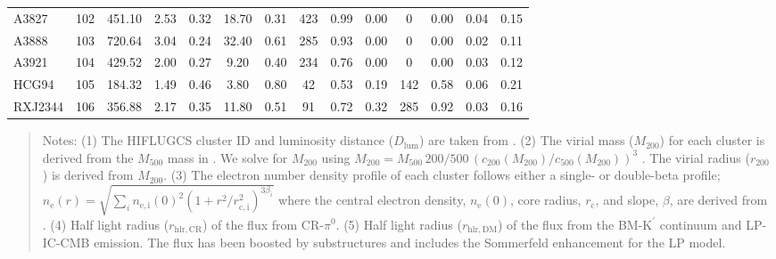\documentclass[10pt,aps,pra,reprint,amsmath,amsfonts,amssymb,showpacs,nofootinbib,floatfix]{revtex4-1}
\newcommand{\rmn}{\mathrm}
\newcommand{\Kp}{\rmn{K}^\prime}
\newcommand{\vst}{\vspace{-0.14mm}}
\newcommand{\rvir}{r_{200}}
\newcommand{\mvir}{M_{200}}
\begin{document}
\begin{table}
\begin{minipage}{2.0\columnwidth}
\begin{tabular}{l c c c c c c c c c c c c c}
A3827 & 102 & 451.10 & 2.53 & 0.32 & 18.70 & 0.31 & 423 & 0.99 & 0.00 & 0 & 0.00 & 0.04 & 0.15 \vst \\
A3888 & 103 & 720.64 & 3.04 & 0.24 & 32.40 & 0.61 & 285 & 0.93 & 0.00 & 0 & 0.00 & 0.02 & 0.11 \vst \\
A3921 & 104 & 429.52 & 2.00 & 0.27 & 9.20 & 0.40 & 234 & 0.76 & 0.00 & 0 & 0.00 & 0.03 & 0.12 \vst \\
HCG94 & 105 & 184.32 & 1.49 & 0.46 & 3.80 & 0.80 & 42 & 0.53 & 0.19 & 142 & 0.58 & 0.06 & 0.21 \vst \\
RXJ2344 & 106 & 356.88 & 2.17 & 0.35 & 11.80 & 0.51 & 91 & 0.72 & 0.32 & 285 & 0.92 & 0.03 & 0.16 \vst \\
\hline
\hline
\end{tabular}
\begin{quote}
  Notes:
  (1) The HIFLUGCS cluster ID and luminosity distance
  ($D_\rmn{lum}$) are taken from \cite{2002ApJ...567..716R}.
  (2) The virial mass ($\mvir$) for each cluster is derived from the $M_{500}$
  mass in \cite{2007A&A...466..805C}. We solve for $\mvir$ using
  $\mvir=M_{500}\,200/500\,(c_{200}(\mvir)/c_{500}(\mvir))^3$ \cite{2005RvMP...77..207V}.
  The virial radius ($\rvir$) is derived from $\mvir$.
  (3) The electron number density profile of each cluster follows either a single- or double-beta profile;
  $n_\rmn{e}(r) = \sqrt{\sum_i n_\rmn{e,i}(0)^2(1+r^2/r_\rmn{c,i}^2)^{3\beta_i}}$
  where the central electron density, $n_\rmn{e}(0)$, core radius, $r_\rmn{c}$, and slope, $\beta$, are derived from
  \cite{2007A&A...466..805C}.
  (4) Half light radius ($r_\rmn{hlr,CR}$) of the flux from CR-$\pi^0$.
  (5) Half light radius ($r_\rmn{hlr,DM}$) of the flux from the BM-$\Kp$
  continuum and LP-IC-CMB emission. The flux has been
  boosted by substructures and includes the Sommerfeld enhancement for the LP model.
  \end{quote}
\end{minipage}
\end{table}
\end{document}
